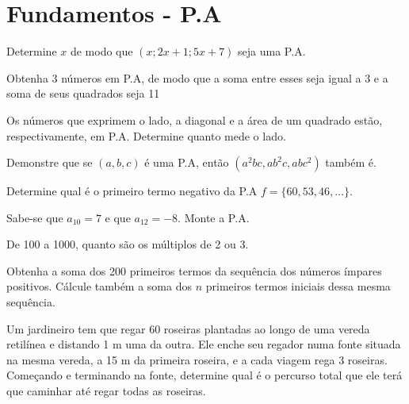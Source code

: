 \section*{Fundamentos - P.A}

\begin{questions}
  \question Determine $x$ de modo que $(x ; 2x + 1 ; 5x + 7)$ seja uma P.A.

  \vspace{0.5cm}

  \question Obtenha 3 números em P.A, de modo que a soma entre esses seja igual a 3 e a soma de seus quadrados seja 11

  \vspace{0.5cm}

  \question Os números que exprimem o lado, a diagonal e a área de um quadrado estão, respectivamente, em P.A. Determine quanto mede o lado.

  \vspace{0.5cm}

  \question Demonstre que se $(a, b, c)$ é uma P.A, então $(a^{2}bc, ab^{2}c, abc^{2})$ também é.

  \vspace{0.5cm}

  \question Determine qual é o primeiro termo negativo da P.A $f = \{60, 53, 46, \dots\}$.

  \vspace{0.5cm}

  \question Sabe-se que $a_{10} = 7$ e que $a_{12} = -8$. Monte a P.A.

  \vspace{0.5cm}

  \question  De 100 a 1000, quanto são os múltiplos de 2 ou 3.

  \vspace{0.5cm}

  \question Obtenha a soma dos 200 primeiros termos da sequência dos números ímpares positivos. Cálcule também a soma dos $n$ primeiros termos iniciais dessa mesma sequência.

  \vspace{0.5cm}

  \question Um jardineiro tem que regar 60 roseiras plantadas ao longo de uma vereda retilínea e distando 1 m uma da outra. Ele enche seu regador numa fonte situada na mesma vereda, a 15 m da primeira roseira, e a cada viagem rega 3 roseiras. Começando e terminando na fonte, determine qual é o percurso total que ele terá que caminhar até regar todas as roseiras.


\end{questions}
